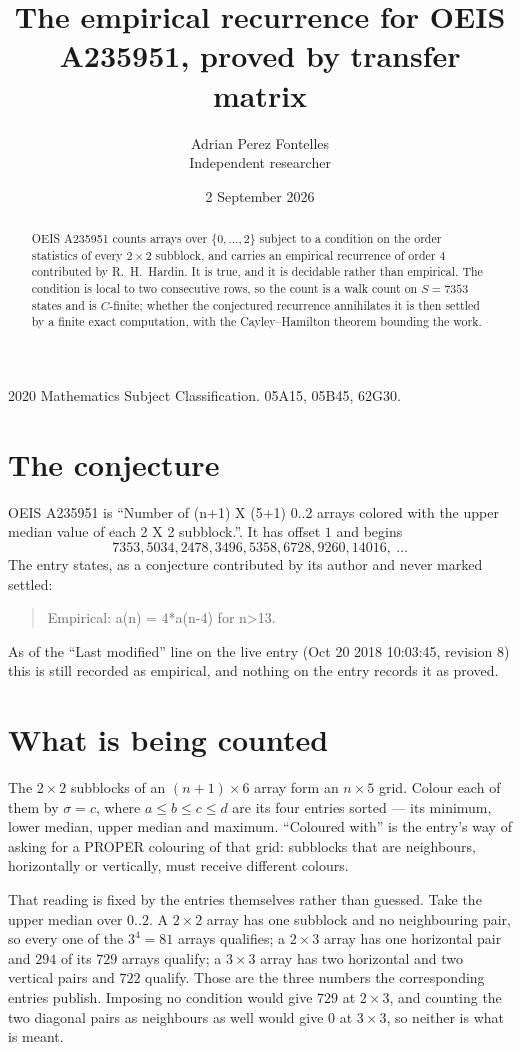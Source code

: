 \documentclass[11pt,a4paper]{article}
\title{The empirical recurrence for OEIS A235951, proved by transfer matrix}
\author{Adrian Perez Fontelles\\ \small Independent researcher}
\date{2 September 2026}
\theoremstyle{plain}
\theoremstyle{definition}
\begin{document}
\maketitle

\begin{abstract}
OEIS A235951 counts arrays over $\{0,\dots,2\}$ subject to a condition on the order
statistics of every $2\times2$ subblock, and carries an empirical recurrence of order
$4$ contributed by R.~H.~Hardin. It is true, and it is decidable rather than empirical.
The condition is local to two consecutive rows, so the count is a walk count on $S=7353$
states and is $C$-finite; whether the conjectured recurrence annihilates it is then settled by
a finite exact computation, with the Cayley--Hamilton theorem bounding the work.
\end{abstract}

\noindent\small 2020 Mathematics Subject Classification. 05A15, 05B45, 62G30.\normalsize

\section{The conjecture}

OEIS A235951 is ``Number of (n+1) X (5+1) 0..2 arrays colored with the upper median value of each 2 X 2 subblock.''. It has offset $1$ and begins
\[
7353, 5034, 2478, 3496, 5358, 6728, 9260, 14016,\ \dots
\]
The entry states, as a conjecture contributed by its author and never marked settled:
\begin{quote}
Empirical: a(n) = 4*a(n-4) for n>13.
\end{quote}
As of the ``Last modified'' line on the live entry (Oct 20 2018 10:03:45, revision 8) this is still
recorded as empirical, and nothing on the entry records it as proved.

\section{What is being counted}

The $2\times2$ subblocks of an $(n+1)\times6$ array form an
$n\times5$ grid. Colour each of them by $\sigma=c$, where $a\le b\le c\le d$ are its four entries sorted --- its minimum, lower median, upper median and maximum. ``Coloured with'' is the entry's way of
asking for a PROPER colouring of that grid: subblocks that are neighbours, horizontally or
vertically, must receive different colours.

That reading is fixed by the entries themselves rather than guessed. Take the upper median
over $0..2$. A $2\times2$ array has one subblock and no neighbouring pair, so every one of the
$3^4=81$ arrays qualifies; a $2\times3$ array has one horizontal pair and $294$ of its $729$
arrays qualify; a $3\times3$ array has two horizontal and two vertical pairs and $722$
qualify. Those are the three numbers the corresponding entries publish. Imposing no condition
would give $729$ at $2\times3$, and counting the two diagonal pairs as neighbours as well
would give $0$ at $3\times3$, so neither is what is meant.
\end{document}
